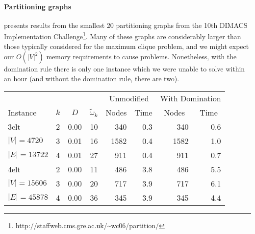 \documentclass[letterpaper]{article}
\begin{document}
\paragraph{Partitioning graphs}

 presents results from the smallest 20 partitioning graphs
from the 10th DIMACS Implementation
Challenge\footnote{http://staffweb.cms.gre.ac.uk/\textasciitilde{}wc06/partition/}.  Many of these graphs are
considerably larger than those typically considered for the maximum clique problem, and we might
expect our $O(|V|^2)$ memory requirements to cause problems. Nonetheless, with the domination rule
there is only one instance which we were unable to solve within an hour (and without the domination
rule, there are two).

\begin{table}
    \scriptsize\setlength{\tabcolsep}{3.5pt} %
    \setlength{\aboverulesep}{-0.4pt}
    \centering
    \begin{tabular}{l c rr rr rr}
        \toprule
        & & & & \multicolumn{2}{c}{Unmodified} & \multicolumn{2}{c}{With Domination} \\
        \cmidrule(lr){5-6} \cmidrule(lr){7-8}
    Instance & \multicolumn{1}{c}{$k$} & \multicolumn{1}{c}{$D$} & \multicolumn{1}{c}{$\tilde{\omega}_k$} &
    \multicolumn{1}{c}{Nodes} & \multicolumn{1}{c}{Time} &
    \multicolumn{1}{c}{Nodes} & \multicolumn{1}{c}{Time} \\
    \midrule
3elt  & 2&0.00&10&340&0.3&340&0.6\\
\hspace*{0.2em}\color{gray}$|V|{=}4720$& 3&0.01&16&1582&0.4&1582&1.0\\
\hspace*{0.2em}\color{gray}$|E|{=}13722$& 4&0.01&27&911&0.4&911&0.7\\
4elt  & 2&0.00&11&486&3.8&486&5.5\\
\hspace*{0.2em}\color{gray}$|V|{=}15606$& 3&0.00&20&717&3.9&717&6.1\\
\hspace*{0.2em}\color{gray}$|E|{=}45878$& 4&0.00&36&345&3.9&345&4.4\\

\end{tabular}
\end{table}
\end{document}
